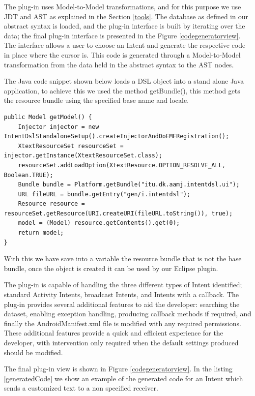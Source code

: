 The plug-in uses Model-to-Model transformations, and for this purpose we use JDT and AST as explained in the Section \ref{tools}. The database as defined in our abstract syntax is loaded, and the plug-in interface is built by iterating over the data; the final plug-in interface is presented in the Figure \ref{codegeneratorview}. The interface allows a user to choose an Intent and generate the respective code in place where the cursor is. This code is generated through a Model-to-Model transformation from the data held in the abstract syntax to the AST nodes.

The Java code snippet shown below loads a DSL object into a stand alone Java application, to achieve this we used the method getBundle(), this method gets the resource bundle using the specified base name and locale.

{\footnotesize\begin{lstlisting}[label=loadingDsl,caption=Loading a DSL object into Java application]
public Model getModel() {
	Injector injector = new IntentDslStandaloneSetup().createInjectorAndDoEMFRegistration();
	XtextResourceSet resourceSet = injector.getInstance(XtextResourceSet.class);
	resourceSet.addLoadOption(XtextResource.OPTION_RESOLVE_ALL, Boolean.TRUE);
	Bundle bundle = Platform.getBundle("itu.dk.aamj.intentdsl.ui");
	URL fileURL = bundle.getEntry("gen/i.intentdsl");
	Resource resource = resourceSet.getResource(URI.createURI(fileURL.toString()), true);
	model = (Model) resource.getContents().get(0);
	return model;
}
\end{lstlisting}}

With this we have save into a variable the resource bundle that is not the base bundle, once the object is created it can be used by our Eclipse plugin.

The plug-in is capable of handling the three different types of Intent identified; standard Activity Intents, broadcast Intents, and Intents with a callback. The plug-in provides several additional features to aid the developer: searching the dataset, enabling exception handling, producing callback methods if required, and finally the AndroidManifest.xml file is modified with any required permissions. These additional features provide a quick and efficient experience for the developer, with intervention only required when the default settings produced should be modified.

The final plug-in view is shown in Figure \ref{codegeneratorview}. In the listing \ref{generatedCode} we show an example of the generated code for an Intent which sends a customized text to a non specified receiver.

